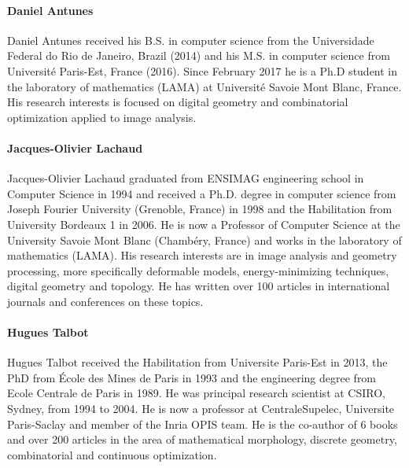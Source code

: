 

\paragraph{Daniel Antunes}
Daniel Antunes received his B.S. in computer science from the Universidade Federal do Rio de Janeiro, Brazil (2014) and his M.S. in  computer science from Universit\'e Paris-Est, France (2016). Since February 2017 he is a Ph.D student in the laboratory of mathematics (LAMA) at Universit\'e Savoie Mont Blanc, France. His research interests is focused on digital geometry and combinatorial optimization applied to image analysis.


\paragraph{Jacques-Olivier Lachaud}
Jacques-Olivier Lachaud graduated from ENSIMAG engineering school in
Computer Science in 1994 and received a Ph.D. degree in computer
science from Joseph Fourier University (Grenoble, France) in 1998 and
the Habilitation from University Bordeaux 1 in 2006. He is now a
Professor of Computer Science at the University Savoie Mont Blanc
(Chambéry, France) and works in the laboratory of mathematics
(LAMA). His research interests are in image analysis and geometry
processing, more specifically deformable models, energy-minimizing
techniques, digital geometry and topology. He has written over 100
articles in international journals and conferences on these topics.

\paragraph{Hugues Talbot}
Hugues Talbot received the Habilitation from Universite Paris-Est in 2013, the PhD from \'Ecole des Mines de Paris in
1993 and the engineering degree from Ecole Centrale de Paris in 1989. He was principal research scientist at CSIRO,
Sydney, from 1994 to 2004. He is now a professor at CentraleSupelec, Universite Paris-Saclay and member of the Inria
OPIS team. He is the co-author of 6 books and over 200 articles in the area of mathematical morphology, discrete
geometry, combinatorial and continuous optimization.

